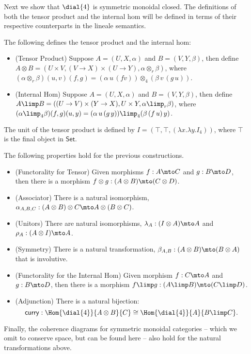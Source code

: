 Next we show that $\dial{4}$ is symmetric monoidal closed.  The
definitions of both the tensor product and the internal hom will be
defined in terms of their respective counterparts in the lineale
semantics.
\begin{definition}
  \label{def:dialectica-model-smcc}
  The following defines the tensor product and the internal hom:
  \begin{itemize}
  \item[] (Tensor Product) Suppose $A = (U , X , \alpha)$ and $B = (V, Y, \beta)$, then
    define $A \otimes B = (U \times V, (V \to X) \times (U \to Y), \alpha \otimes_r \beta)$, where
    $(\alpha \otimes_r \beta)(u, v)(f, g) = (\alpha\,u\,(f v)) \otimes_4 (\beta\,v\,(g\,u))$.\\[-5px]

  \item[] (Internal Hom) Suppose $A = (U , X , \alpha)$ and $B = (V, Y, \beta)$, then
    define $A \limp B = ((U \to V) \times (Y \to X), U \times Y, \alpha \limp_r \beta)$, where
    $(\alpha \limp_4 \beta)(f , g)(u , y) = (\alpha\,u\,(g\,y)) \limp_4 (\beta\,(f\,u)\,y)$.
  \end{itemize}
  The unit of the tensor product is defined by $I = (\top, \top,
  (\lambda x.\lambda y.I_4))$, where $\top$ is the final object in
  $\mathsf{Set}$.
\end{definition}
The following properties hold for the previous constructions.
\begin{lemma}
  \label{lemma:smcc_properties_for_dial4}
  \begin{itemize}
  \item[] (Functorality for Tensor) Given morphisms $f : A \mto C$ and
    $g : B \mto D$, then there is a morphism $f \otimes g : (A \otimes B) \mto (C \otimes D)$.\\[-5px]
  \item[] (Associator) There is a natural isomorphism, $\alpha_{A,B,C} : (A \otimes B) \otimes C \mto A \otimes (B \otimes C)$.\\[-5px]
  \item[] (Unitors) There are natural isomorphisms, $\lambda_A : (I \otimes A) \mto A$ and $\rho_A : (A \otimes I) \mto A$.\\[-5px]
  \item[] (Symmetry) There is a natural transformation, $\beta_{A,B} : (A \otimes B) \mto (B \otimes A)$ that is involutive.\\[-5px]
  \item[] (Functorality for the Internal Hom) Given morphism $f : C \mto A$ and $g : B \mto D$, then there is a morphism $f \limp g : (A \limp B) \mto (C \limp D)$.\\[-5px]
  \item[] (Adjunction) There is a natural bijection:\vspace{-5px}
    \[ \mathsf{curry} : \Hom{\dial{4}}{A \otimes B}{C} \cong \Hom{\dial{4}}{A}{B \limp C}. \]
  \end{itemize}
  Finally, the coherence diagrams for symmetric monoidal categories --
  which we omit to conserve space, but can be found here \cite{?} --
  also hold for the natural transformations above.
\end{lemma}
